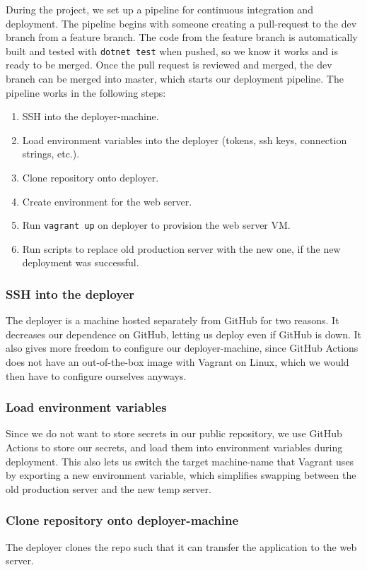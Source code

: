 During the project, we set up a pipeline for continuous integration and deployment. The pipeline begins with someone creating a pull-request to the dev branch from a feature branch. The code from the feature branch is automatically built and tested with \texttt{dotnet test} when pushed, so we know it works and is ready to be merged. Once the pull request is reviewed and merged, the dev branch can be merged into master, which starts our deployment pipeline. The pipeline works in the following steps:
\begin{enumerate}
    \item SSH into the deployer-machine.
    \item Load environment variables into the deployer (tokens, ssh keys, connection strings, etc.).
    \item Clone repository onto deployer.
    \item Create environment for the web server.
    \item Run \texttt{vagrant up} on deployer to provision the web server VM.
    \item Run scripts to replace old production server with the new one, if the new deployment was successful.
\end{enumerate}

\subsubsection{SSH into the deployer}
The deployer is a machine hosted separately from GitHub for two reasons. It decreases our dependence on GitHub, letting us deploy even if GitHub is down. It also gives more freedom to configure our deployer-machine, since GitHub Actions does not have an out-of-the-box image with Vagrant on Linux, which we would then have to configure ourselves anyways.

\subsubsection{Load environment variables}
Since we do not want to store secrets in our public repository, we use GitHub Actions to store our secrets, and load them into environment variables during deployment. This also lets us switch the target machine-name that Vagrant uses by exporting a new environment variable, which simplifies swapping between the old production server and the new temp server.

\subsubsection{Clone repository onto deployer-machine}
The deployer clones the repo such that it can transfer the application to the web server. 


